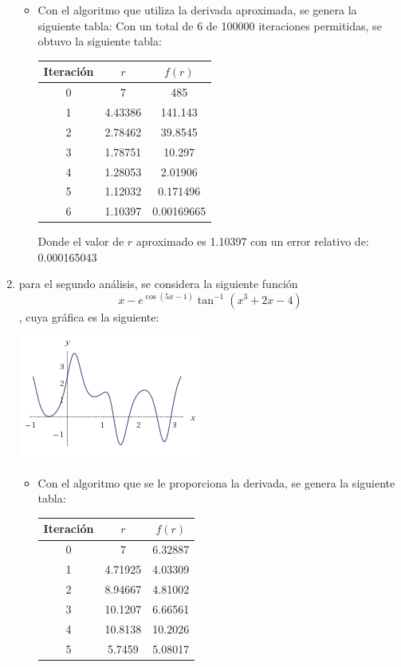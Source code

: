 \documentclass[10pt]{article}
\begin{document}
\begin{enumerate}
\begin{itemize}
 \item Con el algoritmo que utiliza la derivada aproximada, se genera la siguiente tabla:
 Con un total de 6 de 100000 iteraciones permitidas, se obtuvo la siguiente tabla:
\begin{center}
\begin{tabular}{|c|c|c|}
\hline
Iteraci\'on&$r$&$f(r)$\\
\hline
0&7&485\\
1&4.43386&141.143\\
2&2.78462&39.8545\\
3&1.78751&10.297\\
4&1.28053&2.01906\\
5&1.12032&0.171496\\
6&1.10397&0.00169665\\
\hline
\end{tabular}
\end{center}
Donde el valor de $r$ aproximado es 1.10397 con un error relativo de: 0.000165043
\end{itemize}
\item para el segundo an\'alisis, se considera la siguiente funci\'on $$x-e^{\cos(5x-1)}\tan^{-1}(x^3+2x-4)$$,
 cuya gr\'afica es la siguiente:
\begin{center}
 \includegraphics[scale=0.9]{./grafica2.jpg}
\end{center}
\begin{itemize}
 \item Con el algoritmo que se le proporciona la derivada, se genera la siguiente tabla:
 \begin{center}
\begin{tabular}{|c|c|c|}
\hline
Iteraci\'on&$r$&$f(r)$\\
\hline
0&7&6.32887\\
1&4.71925&4.03309\\
2&8.94667&4.81002\\
3&10.1207&6.66561\\
4&10.8138&10.2026\\
5&5.7459&5.08017\\

\end{tabular}
\end{center}
\end{itemize}
\end{enumerate}
\end{document}

